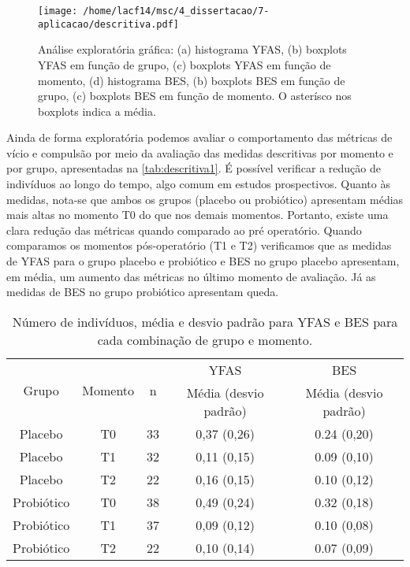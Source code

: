 \begin{figure}[H]
\centering
\texttt{[image: /home/lacf14/msc/4\_dissertacao/7-aplicacao/descritiva.pdf]}
\caption{Análise exploratória gráfica: (a) histograma YFAS, (b) boxplots YFAS em função de grupo, (c) boxplots YFAS em função de momento, (d) histograma BES, (b) boxplots BES em função de grupo, (c) boxplots BES em função de momento. O asterísco nos boxplots indica a média.}
\label{fig:descritiva2}
\end{figure}

Ainda de forma exploratória podemos avaliar o comportamento das métricas de vício e compulsão por meio da avaliação das medidas descritivas por momento e por grupo, apresentadas na \autoref{tab:descritiva1}. É possível verificar a redução de indivíduos ao longo do tempo, algo comum em estudos prospectivos. Quanto às medidas, nota-se que ambos os grupos (placebo ou probiótico) apresentam médias mais altas no momento T0 do que nos demais momentos. Portanto, existe uma clara redução das métricas quando comparado ao pré operatório. Quando comparamos os momentos pós-operatório (T1 e T2) verificamos que as medidas de YFAS para o grupo placebo e probiótico e BES no grupo placebo apresentam, em média, um aumento das métricas no último momento de avaliação. Já as medidas de BES no grupo probiótico apresentam queda.

\begin{table}[H]
\centering
\begin{tabular}{ccccc}
\hline
\multirow{2}{*}{Grupo} & \multirow{2}{*}{Momento} & \multirow{2}{*}{n} & YFAS                  & BES                   \\ \cline{4-5} 
                       &                          &                    & Média (desvio padrão) & Média (desvio padrão) \\ \hline
Placebo                & T0                       & 33                 & 0,37 (0,26)           & 0.24 (0,20)           \\
Placebo                & T1                       & 32                 & 0,11 (0,15)           & 0.09 (0,10)           \\
Placebo                & T2                       & 22                 & 0,16 (0,15)           & 0.10 (0,12)           \\
Probiótico             & T0                       & 38                 & 0,49 (0,24)           & 0.32 (0,18)           \\
Probiótico             & T1                       & 37                 & 0,09 (0,12)           & 0.10 (0,08)           \\
Probiótico             & T2                       & 22                 & 0,10 (0,14)           & 0.07 (0,09)           \\ \hline
\end{tabular}
\caption{Número de indivíduos, média e desvio padrão para YFAS e BES para cada combinação de grupo e momento.}
\label{tab:descritiva1}
\end{table}

